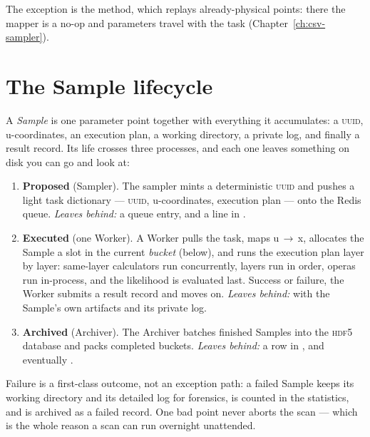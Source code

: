 The exception is the  method, which replays already-physical points: there
the mapper is a no-op and parameters travel with the task
(Chapter~\ref{ch:csv-sampler}).

\section{The Sample lifecycle}
\label{sec:sample-lifecycle}

A \emph{Sample} is one parameter point together with everything it accumulates: a
\textsc{uuid}, u-coordinates, an execution plan, a working directory, a private log, and
finally a result record. Its life crosses three processes, and each one leaves something
on disk you can go and look at:

\begin{enumerate}
  \item \textbf{Proposed} (Sampler). The sampler mints a deterministic \textsc{uuid} and
        pushes a light task dictionary --- \textsc{uuid}, u-coordinates, execution plan
        --- onto the Redis queue. \emph{Leaves behind:} a queue entry, and a line in
        .
  \item \textbf{Executed} (one Worker). A Worker pulls the task, maps
        u\,$\rightarrow$\,x, allocates the Sample a slot in the current \emph{bucket}
        (below), and runs the execution plan layer by layer: same-layer calculators run
        concurrently, layers run in order, operas run in-process, and the likelihood is
        evaluated last. Success or failure, the Worker submits a result record and moves
        on. \emph{Leaves behind:}  with the Sample's own
        artifacts and its private log.
  \item \textbf{Archived} (Archiver). The Archiver batches finished Samples into the
        \textsc{hdf5} database and packs completed buckets. \emph{Leaves behind:} a row in
        , and eventually
        .
\end{enumerate}

\begin{jnote}
Failure is a first-class outcome, not an exception path: a failed Sample keeps its
working directory and its detailed log for forensics, is counted in the statistics, and
is archived as a failed record. One bad point never aborts the scan --- which is the
whole reason a scan can run overnight unattended.
\end{jnote}

